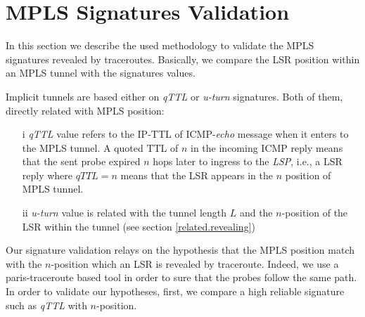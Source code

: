 \section{MPLS Signatures Validation}\label{validation}

In this section we describe the used methodology to validate the MPLS signatures
revealed by traceroutes. Basically, we compare the LSR position within an MPLS tunnel with the signatures values.

Implicit tunnels are based either on \textit{qTTL} or \textit{u-turn} signatures. Both of
them, directly related with MPLS position:

\begin{itemize}
  \item[i] \textit{qTTL} value refers to the IP-TTL of ICMP-\textit{echo}
  message when it enters to the MPLS  tunnel. A quoted TTL of $n$ in
  the incoming ICMP reply means that the sent probe
  expired $n$ hops later to ingress to the \textit{LSP}, i.e., a LSR reply where $\textit{qTTL}=n$ means that the LSR appears  in the $n$ position of MPLS tunnel.
  \item[ii] \textit{u-turn} value is related with the tunnel length $L$ and the $n$-position of the LSR within the tunnel (see section \ref{related.revealing})
\end{itemize}



Our signature validation relays on the hypothesis that the MPLS position match
with the $n$-position  which an LSR is revealed by traceroute. Indeed,
we use a paris-traceroute \cite{BRICE06}  based tool in order to sure that the probes follow the
same path. In order to validate our hypotheses, first, we compare a high reliable signature such as \textit{qTTL} with  $n$-position.


